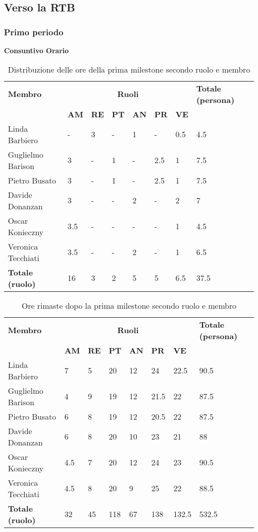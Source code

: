 \subsection{Verso la RTB}
\subsubsection{Primo periodo}
\textbf{Consuntivo Orario}
\\
\begin{table}[ht!]
	\centering
	\begin{tabular}{p{4cm} p{1cm} p{1cm} p{1cm} p{1cm} p{1cm} p{1cm} p{3cm}}
		\toprule
        \textbf{Membro} & \multicolumn{6}{c}{\textbf{Ruoli}} & \textbf{Totale (persona)}\\
		& \textbf{AM} & \textbf{RE} & \textbf{PT} & \textbf{AN} & \textbf{PR} & \textbf{VE}\\
		\midrule
        Linda Barbiero & - & 3 & - & 1 & - & 0.5 & 4.5 \\
        Guglielmo Barison & 3 & - & 1 & - & 2.5 & 1 & 7.5\\
        Pietro Busato & 3 & - & 1 & - & 2.5 & 1 & 7.5 \\
        Davide Donanzan & 3 & - & - & 2 & - & 2 & 7 \\
        Oscar Konieczny & 3.5 & - & - & - & - & 1 & 4.5 \\
        Veronica Tecchiati & 3.5 & - & - & 2 & - & 1 & 6.5 \\
        \bottomrule
        \textbf{Totale (ruolo)} & 16 & 3 & 2 & 5 & 5 & 6.5 & 37.5 \\
	\end{tabular}
	\caption{Distribuzione delle ore della prima milestone secondo ruolo e membro}
	\label{table:Distribuzione delle ore consuntive della prima milestone secondo ruolo e membro}
\end{table}
\newpage
\begin{table}[ht!]
	\centering
	\begin{tabular}{p{4cm} p{1cm} p{1cm} p{1cm} p{1cm} p{1cm} p{1cm} p{3cm}}
		\toprule
        \textbf{Membro} & \multicolumn{6}{c}{\textbf{Ruoli}} & \textbf{Totale (persona)}\\
		& \textbf{AM} & \textbf{RE} & \textbf{PT} & \textbf{AN} & \textbf{PR} & \textbf{VE}\\
		\midrule
        Linda Barbiero & 7 & 5 & 20 & 12 & 24 & 22.5 & 90.5 \\
        Guglielmo Barison & 4 & 9 & 19 & 12 & 21.5 & 22 & 87.5\\
        Pietro Busato & 6 & 8 & 19 & 12 & 20.5 & 22 & 87.5 \\
        Davide Donanzan & 6 & 8 & 20 & 10 & 23 & 21 & 88 \\
        Oscar Konieczny & 4.5 & 7 & 20 & 12 & 24 & 23 & 90.5 \\
        Veronica Tecchiati & 4.5 & 8 & 20 & 9 & 25 & 22 & 88.5 \\
        \bottomrule
        \textbf{Totale (ruolo)} & 32 & 45 & 118 & 67 & 138 & 132.5 & 532.5 \\
	\end{tabular}
	\caption{Ore rimaste dopo la prima milestone secondo ruolo e membro}
	\label{table:Ore rimaste dopo la prima milestone secondo ruolo e membro}
\end{table}
